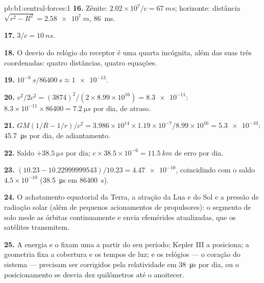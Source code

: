 \begin{solution}{pb:b1:central-forces:1}
\textbf{16.} Zênite: $2.02\times10^7/c = \qty{67}{ms}$; horizonte: distância
$\sqrt{r^2 - R^2} = \qty{2.58e7}{m}$, \qty{86}{ms}.

\textbf{17.} $3/c = \qty{10}{ns}$.

\textbf{18.} O desvio do relógio do receptor é uma quarta incógnita, além das suas
três coordenadas: quatro distâncias, quatro equações.

\textbf{19.} $10^{-8}\ \unit{s}/\qty{86400}{s} \approx \num{1e-13}$.

\textbf{20.} $v^2/2c^2 = (3874)^2/(2 \times 8.99\times10^{16}) = \num{8.3e-11}$:
$8.3\times10^{-11} \times 86400 = \qty{7.2}{\micro s}$ por dia, de atraso.

\textbf{21.} $GM(1/R - 1/r)/c^2 = 3.986\times10^{14} \times 1.19\times10^{-7}/
8.99\times10^{16} = \num{5.3e-10}$: \qty{45.7}{\micro s} por dia, de adiantamento.

\textbf{22.} Saldo $+\qty{38.5}{\micro s}$ por dia; $c \times 38.5\times10^{-6}
= \qty{11.5}{km}$ de erro por dia.

\textbf{23.} $(10.23 - 10.22999999543)/10.23 = \num{4.47e-10}$, coincidindo com
o saldo $4.5\times10^{-10}$ (\qty{38.5}{\micro s} em \qty{86400}{s}).

\textbf{24.} O achatamento equatorial da Terra, a atração da Lua e do Sol e
a pressão de radiação solar (além de pequenos acionamentos de propulsores): o
segmento de solo mede as órbitas continuamente e envia efemérides
atualizadas, que os satélites transmitem.

\textbf{25.} A energia e o  fixam uma  a partir do seu
período; Kepler III a posiciona; a geometria fixa a cobertura e os tempos de luz;
e os relógios --- o coração do sistema --- precisam ser corrigidos pela
relatividade em \qty{38}{\micro s} por dia, ou o posicionamento se desvia dez
quilômetros até o anoitecer.
\end{solution}
